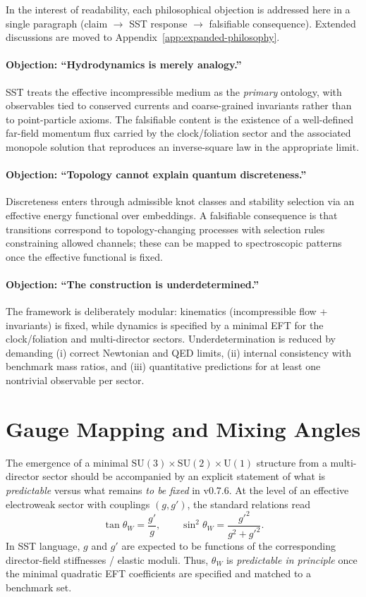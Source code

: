 \documentclass[10pt]{article}
\begin{document}
In the interest of readability, each philosophical objection is addressed here
in a single paragraph (claim $\rightarrow$ SST response $\rightarrow$ falsifiable
consequence). Extended discussions are moved to Appendix~\ref{app:expanded-philosophy}.

\paragraph{Objection: ``Hydrodynamics is merely analogy.''}
SST treats the effective incompressible medium as the \emph{primary} ontology,
with observables tied to conserved currents and coarse-grained invariants rather
than to point-particle axioms. The falsifiable content is the existence of a
well-defined far-field momentum flux carried by the clock/foliation sector and
the associated monopole solution that reproduces an inverse-square law in the
appropriate limit.

\paragraph{Objection: ``Topology cannot explain quantum discreteness.''}
Discreteness enters through admissible knot classes and stability selection
via an effective energy functional over embeddings. A falsifiable consequence is
that transitions correspond to topology-changing processes with selection rules
constraining allowed channels; these can be mapped to spectroscopic patterns once
the effective functional is fixed.

\paragraph{Objection: ``The construction is underdetermined.''}
The framework is deliberately modular: kinematics (incompressible flow + invariants)
is fixed, while dynamics is specified by a minimal EFT for the clock/foliation and
multi-director sectors. Underdetermination is reduced by demanding (i) correct
Newtonian and QED limits, (ii) internal consistency with benchmark mass ratios,
and (iii) quantitative predictions for at least one nontrivial observable per sector.


\section{Gauge Mapping and Mixing Angles}
\label{sec:v075-mixing}

The emergence of a minimal $\mathrm{SU}(3)\times\mathrm{SU}(2)\times\mathrm{U}(1)$
structure from a multi-director sector should be accompanied by an explicit statement
of what is \emph{predictable} versus what remains \emph{to be fixed} in v0.7.6.
At the level of an effective electroweak sector with couplings $(g,g')$, the standard
relations read
\begin{equation}
\tan\theta_W=\frac{g'}{g},
\qquad
\sin^2\theta_W=\frac{g'^2}{g^2+g'^2}.
\end{equation}
In SST language, $g$ and $g'$ are expected to be functions of the corresponding
director-field stiffnesses / elastic moduli. Thus, $\theta_W$ is \emph{predictable
in principle} once the minimal quadratic EFT coefficients are specified and matched
to a benchmark set.
\end{document}
